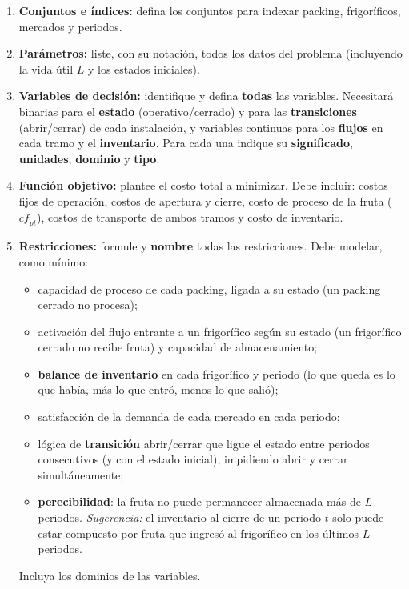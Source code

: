 \documentclass[12pt,a4paper]{article}
\begin{document}
\begin{enumerate}[label=\alph*), leftmargin=*, topsep=2pt]
    \item \textbf{Conjuntos e índices:} defina los conjuntos para indexar packing,
          frigoríficos, mercados y periodos.
    \item \textbf{Parámetros:} liste, con su notación, todos los datos del
          problema (incluyendo la vida útil $L$ y los estados iniciales).
    \item \textbf{Variables de decisión:} identifique y defina \textbf{todas} las
          variables. Necesitará binarias para el \textbf{estado} (operativo/cerrado)
          y para las \textbf{transiciones} (abrir/cerrar) de cada instalación, y
          variables continuas para los \textbf{flujos} en cada tramo y el
          \textbf{inventario}. Para cada una indique su \textbf{significado},
          \textbf{unidades}, \textbf{dominio} y \textbf{tipo}.
    \item \textbf{Función objetivo:} plantee el costo total a minimizar. Debe
          incluir: costos fijos de operación, costos de apertura y cierre, costo
          de proceso de la fruta ($\mathit{cf}_{pt}$), costos de transporte de
          ambos tramos y costo de inventario.
    \item \textbf{Restricciones:} formule y \textbf{nombre} todas las
          restricciones. Debe modelar, como mínimo:
          \begin{itemize}[leftmargin=1.4em, topsep=1pt]
            \item capacidad de proceso de cada packing, ligada a su estado
                  (un packing cerrado no procesa);
            \item activación del flujo entrante a un frigorífico según su estado
                  (un frigorífico cerrado no recibe fruta) y capacidad de
                  almacenamiento;
            \item \textbf{balance de inventario} en cada frigorífico y periodo
                  (lo que queda es lo que había, más lo que entró, menos lo que
                  salió);
            \item satisfacción de la demanda de cada mercado en cada periodo;
            \item lógica de \textbf{transición} abrir/cerrar que ligue el estado
                  entre periodos consecutivos (y con el estado inicial), impidiendo
                  abrir y cerrar simultáneamente;
            \item \textbf{perecibilidad}: la fruta no puede permanecer almacenada
                  más de $L$ periodos. \emph{Sugerencia:} el inventario al cierre
                  de un periodo $t$ solo puede estar compuesto por fruta que
                  ingresó al frigorífico en los últimos $L$ periodos.
          \end{itemize}
          Incluya los dominios de las variables.
\end{enumerate}
\end{document}
